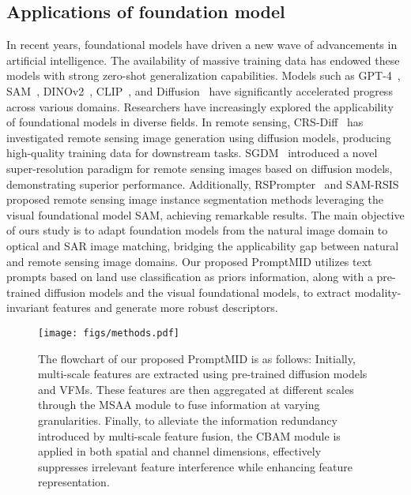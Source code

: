 \subsection{Applications of foundation model}
In recent years, foundational models have driven a new wave of advancements in artificial intelligence. The availability of massive training data has endowed these models with strong zero-shot generalization capabilities. Models such as GPT-4~\cite{achiam2023gpt}, SAM~\cite{kirillov2023segany}, DINOv2~\cite{oquab2023dinov2}, CLIP~\cite{radford2021learning}, and Diffusion~\cite{SD} have significantly accelerated progress across various domains. Researchers have increasingly explored the applicability of foundational models in diverse fields. In remote sensing, CRS-Diff~\cite{10663449} has investigated remote sensing image generation using diffusion models, producing high-quality training data for downstream tasks. SGDM~\cite{WANG2025125} introduced a novel super-resolution paradigm for remote sensing images based on diffusion models, demonstrating superior performance. Additionally, RSPrompter~\cite{10409216} and SAM-RSIS~\cite{10680168} proposed remote sensing image instance segmentation methods leveraging the visual foundational model SAM, achieving remarkable results. The main objective of ours study is to adapt foundation models from the natural image domain to optical and SAR image matching, bridging the applicability gap between natural and remote sensing image domains. Our proposed PromptMID utilizes text prompts based on land use classification as priors information, along with a pre-trained diffusion models and the visual foundational models, to extract modality-invariant features and generate more robust descriptors.

\begin{figure*}[!t]
	\centering
	\texttt{[image: figs/methods.pdf]}
	\caption{The flowchart of our proposed PromptMID is as follows: Initially, multi-scale features are extracted using pre-trained diffusion models and VFMs. These features are then aggregated at different scales through the MSAA module to fuse information at varying granularities. Finally, to alleviate the information redundancy introduced by multi-scale feature fusion, the CBAM module is applied in both spatial and channel dimensions, effectively suppresses irrelevant feature interference while enhancing feature representation.}
	\label{fig.all}
\end{figure*}